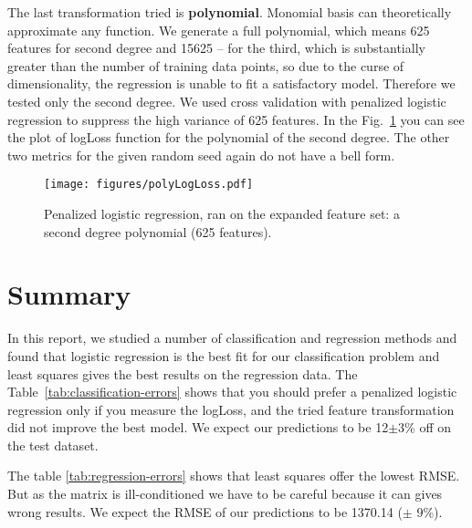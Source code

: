 \documentclass{article} %
\begin{document}
The last transformation tried is {\bf polynomial}. Monomial basis can theoretically approximate any function. We generate a full polynomial, which means 625 features for second degree and 15625 -- for the third, which is substantially greater than the number of training data points, so due to the curse of dimensionality, the regression is unable to fit a satisfactory model. Therefore we tested only the second degree. We used cross validation with penalized logistic regression to suppress the high variance of 625 features. In the Fig.~\ref{fig:polyErrors} you can see the plot of logLoss function for the polynomial of the second degree. The other two metrics for the given random seed again do not have a bell form.

\begin{figure}[h]
\center
\texttt{[image: figures/polyLogLoss.pdf]}
\caption{Penalized logistic regression, ran on the expanded feature set: a second degree polynomial (625 features).}
\label{fig:polyErrors}
\end{figure}

\section{Summary}

In this report, we studied a number of classification and regression methods and found that logistic regression is the best fit for our classification problem and least squares gives the best results on the regression data. The Table~\ref{tab:classification-errors} shows that you should prefer a penalized logistic regression only if you measure the logLoss, and the tried feature transformation did not improve the best model. We expect our predictions to be 12$\pm$3\% off on the test dataset.

The table \ref{tab:regression-errors} shows that least squares offer the lowest RMSE. But as the matrix is ill-conditioned we have to be careful because it can gives wrong results. 
We expect the RMSE of our predictions to be 1370.14 ($\pm$ 9\%).
\end{document}
